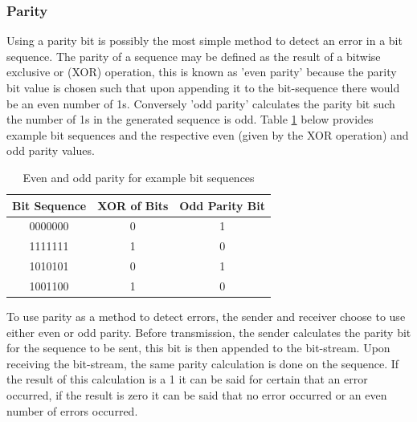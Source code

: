 \subsubsection{Parity}
Using a parity bit is possibly the most simple method to detect an error in a bit sequence. The parity of a sequence may be defined as the result of a bitwise exclusive or (XOR) operation, this is known as 'even parity' because the parity bit value is chosen such that upon appending it to the bit-sequence there would be an even number of 1s. Conversely 'odd parity' calculates the parity bit such the number of 1s in the generated sequence is odd. Table \ref{tbl:party_examples} below provides example bit sequences and the respective even (given by the XOR operation) and odd parity values.

\begin{table}[H]
	\centering
	\begin{tabular}{ccc}
		\hline
		\multicolumn{1}{l}{\textbf{Bit Sequence}} & \textbf{XOR of Bits} & \multicolumn{1}{l}{\textbf{Odd Parity Bit}} \\ \hline
		0000000 & 0 & 1 \\ \hline
		1111111 & 1 & 0 \\ \hline
		1010101 & 0 & 1 \\ \hline
		1001100 & 1 & 0 \\ \hline
	\end{tabular}
	\caption{Even and odd parity for example bit sequences}
	\label{tbl:party_examples}
\end{table}

To use parity as a method to detect errors, the sender and receiver choose to use either even or odd parity. Before transmission, the sender calculates the parity bit for the sequence to be sent, this bit is then appended to the bit-stream. Upon receiving the bit-stream, the same parity calculation is done on the sequence. If the result of this calculation is a 1 it can be said for certain that an error occurred, if the result is zero it can be said that no error occurred or an even number of errors occurred.






